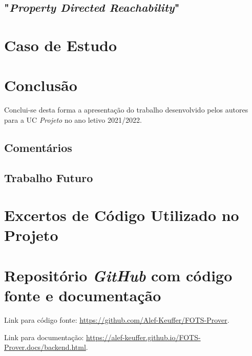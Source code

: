 \documentclass[11pt,a4paper]{report}%
\def\proj{\emph{Projeto}\xspace}
\def\pdr{"\textit{Property Directed Reachability}"\xspace}
\begin{document}
\newpage
\section{\pdr}

\chapter{Caso de Estudo}\label{chap:case_study}



\chapter{Conclusão} \label{chap:concl}

Conclui-se desta forma a apresentação do trabalho desenvolvido pelos autores
para a UC \proj no ano letivo 2021/2022.

\section{Comentários}

\section{Trabalho Futuro}

\appendix %
\chapter{Excertos de Código Utilizado no Projeto} \label{apndx:samples}

\chapter{Repositório \textit{GitHub} com código fonte e documentação} \label{apndx:github}

Link para código fonte: \url{https://github.com/Alef-Keuffer/FOTS-Prover}.

Link para documentação: \url{https://alef-keuffer.github.io/FOTS-Prover.docs/backend.html}.

\newpage



\end{document}
